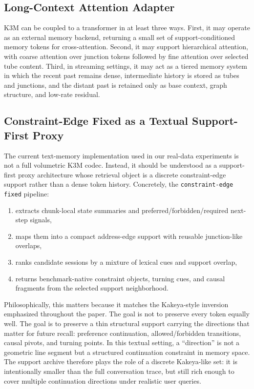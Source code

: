 \documentclass[11pt]{article}
\begin{document}
\subsection{Long-Context Attention Adapter}
K3M can be coupled to a transformer in at least three ways. First, it may operate as an external memory backend, returning a small set of support-conditioned memory tokens for cross-attention. Second, it may support hierarchical attention, with coarse attention over junction tokens followed by fine attention over selected tube content. Third, in streaming settings, it may act as a tiered memory system in which the recent past remains dense, intermediate history is stored as tubes and junctions, and the distant past is retained only as base context, graph structure, and low-rate residual.

\subsection{Constraint-Edge Fixed as a Textual Support-First Proxy}
The current text-memory implementation used in our real-data experiments is not a full volumetric K3M codec. Instead, it should be understood as a support-first proxy architecture whose retrieval object is a discrete constraint-edge support rather than a dense token history. Concretely, the \texttt{constraint-edge fixed} pipeline:
\begin{enumerate}[leftmargin=1.5em]
\item extracts chunk-local state summaries and preferred/forbidden/required next-step signals,
\item maps them into a compact address-edge support with reusable junction-like overlaps,
\item ranks candidate sessions by a mixture of lexical cues and support overlap,
\item returns benchmark-native constraint objects, turning cues, and causal fragments from the selected support neighborhood.
\end{enumerate}

Philosophically, this matters because it matches the Kakeya-style inversion emphasized throughout the paper. The goal is not to preserve every token equally well. The goal is to preserve a thin structural support carrying the directions that matter for future recall: preference continuation, allowed/forbidden transitions, causal pivots, and turning points. In this textual setting, a ``direction'' is not a geometric line segment but a structured continuation constraint in memory space. The support archive therefore plays the role of a discrete Kakeya-like set: it is intentionally smaller than the full conversation trace, but still rich enough to cover multiple continuation directions under realistic user queries.
\end{document}
